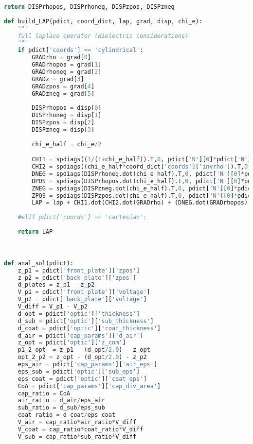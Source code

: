 \begin{lstlisting}[frame=single, language=Python]
    return DISPrhopos, DISPrhoneg, DISPzpos, DISPzneg
             
def build_LAP(pdict, coord_dict, lap, grad, disp, chi_e):
    """
    full laplace operator (dielectric considerations)
    """
    if pdict['coords'] == 'cylindrical':
        GRADrho = grad[0]
        GRADrhopos = grad[1]
        GRADrhoneg = grad[2]
        GRADz = grad[3]
        GRADzpos = grad[4]
        GRADzneg = grad[5]
        
        DISPrhopos = disp[0]
        DISPrhoneg = disp[1]
        DISPzpos = disp[2]
        DISPzneg = disp[3]
    
        chi_e_half = chi_e/2

        CHI1 = spdiags((1/(1+chi_e_half)).T,0, pdict['N'][0]*pdict['N'][1], pdict['N'][0]*pdict['N'][1], format='lil')
        CHI2 = spdiags((chi_e_half*coord_dict['coords']['invrho']).T,0, pdict['N'][0]*pdict['N'][1], pdict['N'][0]*pdict['N'][1], format='lil')
        DNEG = spdiags(DISPrhoneg.dot(chi_e_half).T,0, pdict['N'][0]*pdict['N'][1], pdict['N'][0]*pdict['N'][1], format='lil')
        DPOS = spdiags(DISPrhopos.dot(chi_e_half).T,0, pdict['N'][0]*pdict['N'][1], pdict['N'][0]*pdict['N'][1], format='lil')
        ZNEG = spdiags(DISPzneg.dot(chi_e_half).T,0, pdict['N'][0]*pdict['N'][1], pdict['N'][0]*pdict['N'][1], format='lil')
        ZPOS = spdiags(DISPzpos.dot(chi_e_half).T,0, pdict['N'][0]*pdict['N'][1], pdict['N'][0]*pdict['N'][1], format='lil')
        LAP = lap + CHI1.dot(CHI2.dot(GRADrho) + (DNEG.dot(GRADrhopos) - DPOS.dot(GRADrhoneg))/pdict['res'][0] + (ZNEG.dot(GRADzpos) - ZPOS.dot(GRADzneg))/pdict['res'][1]) 
        
    #elif pdict['coords'] == 'cartesian':
        
    return LAP



def anal_sol(pdict):
    z_p1 = pdict['front_plate']['zpos']
    z_p2 = pdict['back_plate']['zpos']
    d_plates = z_p1 - z_p2
    V_p1 = pdict['front_plate']['voltage']
    V_p2 = pdict['back_plate']['voltage']
    V_diff = V_p1 - V_p2
    d_opt = pdict['optic']['thickness']
    d_sub = pdict['optic']['sub_thickness']
    d_coat = pdict['optic']['coat_thickness']
    d_air = pdict['cap_params']['d_air']
    z_opt = pdict['optic']['z_com']
    p1_2_opt  = z_p1 - (d_opt/2.0) - z_opt
    opt_2_p2 = z_opt - (d_opt/2.0) - z_p2
    eps_air = pdict['cap_params']['air_eps']
    eps_sub = pdict['optic']['sub_eps']   
    eps_coat = pdict['optic']['coat_eps']
    CoA = pdict['cap_params']['cap_div_area']
    cap_ratio = CoA
    air_ratio = d_air/eps_air
    sub_ratio = d_sub/eps_sub
    coat_ratio = d_coat/eps_coat
    V_air = cap_ratio*air_ratio*V_diff
    V_coat = cap_ratio*coat_ratio*V_diff
    V_sub = cap_ratio*sub_ratio*V_diff
    


\end{lstlisting}
